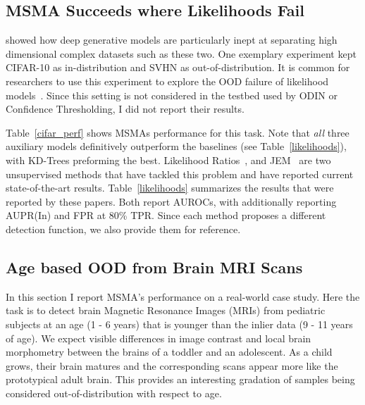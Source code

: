 \subsection*{MSMA Succeeds where Likelihoods Fail}

\cite{nalisnick2018do} showed how deep generative models are particularly inept at separating high dimensional complex datasets such as these two. One exemplary experiment kept CIFAR-10 as in-distribution and SVHN as out-of-distribution. It is common for researchers to use this experiment to explore the OOD failure of likelihood models~\cite{why_norm_fails,Ren2019,Grathwohl2020Your}. Since this setting is not considered in the testbed used by ODIN or Confidence Thresholding, I did not report their results. 

Table~\ref{cifar_perf} shows MSMAs performance for this task. Note that \textit{all} three auxiliary models definitively outperform the baselines (see Table~\ref{likelihoods}), with KD-Trees preforming the best. Likelihood Ratios~\cite{Ren2019}, and JEM~\cite{Grathwohl2020Your} are two unsupervised methods that have tackled this problem and have reported current state-of-the-art results. Table~\ref{likelihoods} summarizes the results that were reported by these papers. Both report AUROCs, with \cite{Ren2019} additionally reporting AUPR(In) and FPR at 80\% TPR. Since each method proposes a different detection function, we also provide them for reference.
\goodbreak

\subsection{Age based OOD from Brain MRI Scans}
\label{brain_experiment}

In this section I report MSMA's performance on a real-world case study. Here the task is to detect brain Magnetic Resonance Images (MRIs) from pediatric subjects at an age (1 - 6 years) that is younger than the inlier data (9 - 11 years of age). We expect visible differences in image contrast and local brain morphometry between the brains of a toddler and an adolescent. As a child grows, their brain matures and the corresponding scans appear more like the prototypical adult brain. This provides an interesting gradation of samples being considered out-of-distribution with respect to age.

